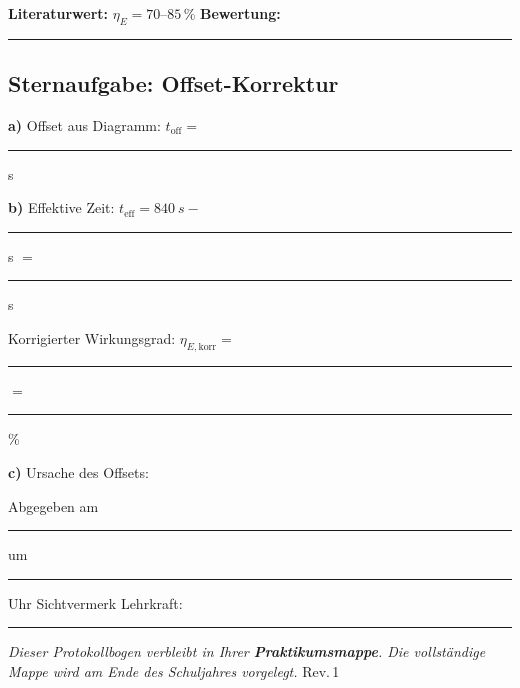 \documentclass[11pt,a4paper]{scrartcl}
\begin{document}
	\vspace{0.8cm}
	
	\begin{tcolorbox}[colback=yellow!10!white, colframe=yellow!50!black]
		\textbf{Literaturwert:} $\eta_E = 70$--$85\,\%$ \hfill \textbf{Bewertung:} \rule{4cm}{0.4pt}
	\end{tcolorbox}
	
	\subsection*{Sternaufgabe: Offset-Korrektur}
	
	\textbf{a)} Offset aus Diagramm: \quad $t_{\text{off}} = $ \rule{2cm}{0.4pt} s
	
	\vspace{0.3cm}
	
	\textbf{b)} Effektive Zeit: \quad $t_{\text{eff}} = \SI{840}{s} - $ \rule{1.5cm}{0.4pt} s $= $ \rule{2cm}{0.4pt} s
	
	\vspace{0.3cm}
	
	\hspace{0.5cm} Korrigierter Wirkungsgrad: \quad $\eta_{E,\text{korr}} = $ \rule{3cm}{0.4pt} $= $ \rule{2cm}{0.4pt} \%
	
	\vspace{0.5cm}
	
	\textbf{c)} Ursache des Offsets:
	
	\vspace{2cm}
	

	\vspace{0.4cm}
	\begin{tcolorbox}[colback=yellow!8, colframe=black, boxrule=0.6pt, title={\faIcon{check-circle}\enspace Abgabevermerk -- wird vor Ort ausgefüllt}, fonttitle=\bfseries]
		Abgegeben am \rule{2.8cm}{0.4pt} \enspace um \rule{2cm}{0.4pt} Uhr \hfill Sichtvermerk Lehrkraft: \rule{3.5cm}{0.4pt}

		\vspace{0.15cm}
		{\small\textit{Dieser Protokollbogen verbleibt in Ihrer \textbf{Praktikumsmappe}. Die vollständige Mappe wird am Ende des Schuljahres vorgelegt.} \hfill \scriptsize Rev.\,1}
	\end{tcolorbox}
\end{document}
